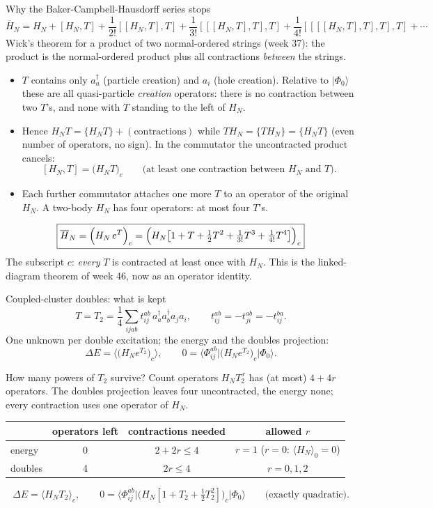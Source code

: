 \documentclass[aspectratio=169,10pt]{beamer}
\newcommand{\ket}[1]{\vert #1\rangle}
\newcommand{\mel}[3]{\langle #1\lvert #2\rvert #3\rangle}
\newcommand{\av}[1]{\langle #1\rangle_0}
\newcommand{\cre}[1]{a_{#1}^{\dagger}}
\newcommand{\ann}[1]{a_{#1}}
\newcommand{\no}[1]{\bigl\{#1\bigr\}}
\newcommand{\ph}{\Phi_0}
\newcommand{\Hbar}{\overline{H}}
\begin{document}
\begin{frame}[shrink=6]{Why the Baker-Campbell-Hausdorff series stops}
\small
\[
 \Hbar_N=H_N+[H_N,T]+\frac1{2!}[[H_N,T],T]+\frac1{3!}[[[H_N,T],T],T]+\frac1{4!}[[[[H_N,T],T],T],T]+\cdots
\]
Wick's theorem for a product of two normal-ordered strings (week 37): the product is the normal-ordered product plus all contractions \emph{between} the strings.
\begin{itemize}
\item $T$ contains only $\cre{a}$ (particle creation) and $\ann{i}$ (hole creation). Relative to $\ket{\ph}$ these are all quasi-particle \emph{creation} operators: there is no contraction between two $T$'s, and none with $T$ standing to the left of $H_N$.
\item Hence $H_NT=\no{H_NT}+(\text{contractions})$ while $TH_N=\no{TH_N}=\no{H_NT}$ (even number of operators, no sign). In the commutator the uncontracted product cancels:
\[
 [H_N,T]=\bigl(H_NT\bigr)_c\qquad\text{(at least one contraction between $H_N$ and $T$).}
\]
\item Each further commutator attaches one more $T$ to an operator of the original $H_N$. A two-body $H_N$ has four operators: at most four $T$'s.
\end{itemize}
\[
 \boxed{\Hbar_N=\Bigl(H_N\,e^{T}\Bigr)_c
 =\Bigl(H_N\bigl[1+T+\tfrac12T^2+\tfrac1{3!}T^3+\tfrac1{4!}T^4\bigr]\Bigr)_c}
\]
The subscript $c$: \emph{every} $T$ is contracted at least once with $H_N$. This is the linked-diagram theorem of week 46, now as an operator identity.
\end{frame}

\begin{frame}[shrink=19]{Coupled-cluster doubles: what is kept}
\[
 T=T_2=\frac14\sum_{ijab}t_{ij}^{ab}\,\cre a\cre b\ann j\ann i,\qquad
 t_{ij}^{ab}=-t_{ji}^{ab}=-t_{ij}^{ba}.
\]
One unknown per double excitation; the energy and the doubles projection:
\[
 \Delta E=\langle\bigl(H_Ne^{T_2}\bigr)_c\rangle,\qquad
 0=\mel{\Phi_{ij}^{ab}}{\bigl(H_Ne^{T_2}\bigr)_c}{\ph}.
\]
\begin{block}{How many powers of $T_2$ survive? Count operators}
$H_NT_2^{\,r}$ has (at most) $4+4r$ operators. The doubles projection leaves four uncontracted, the energy none; every contraction uses one operator of $H_N$.
\begin{center}
\begin{tabular}{lccc}
\toprule
 & operators left & contractions needed & allowed $r$\\
\midrule
energy & 0 & $2+2r\le4$ & $r=1$ ($r=0$: $\av{H_N}=0$)\\
doubles & 4 & $2r\le4$ & $r=0,1,2$\\
\bottomrule
\end{tabular}
\end{center}
\end{block}
\[
 \Delta E=\langle H_NT_2\rangle_c,\qquad
 0=\mel{\Phi_{ij}^{ab}}{\bigl(H_N[1+T_2+\tfrac12T_2^2]\bigr)_c}{\ph}\qquad\text{(exactly quadratic).}
\]
\end{frame}
\end{document}
